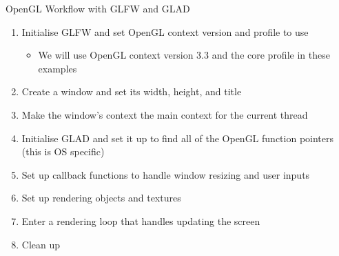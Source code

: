 \documentclass{beamer}
\begin{document}
\begin{frame}[fragile]{OpenGL Workflow with GLFW and GLAD}
    \begin{enumerate}
        \item Initialise GLFW and set OpenGL context version and profile to use
              \begin{itemize}
                  \item We will use OpenGL context version 3.3 and the core profile in these examples
              \end{itemize}
        \item Create a window and set its width, height, and title
        \item Make the window's context the main context for the current thread
        \item Initialise GLAD and set it up to find all of the OpenGL function pointers (this is OS specific)
        \item Set up callback functions to handle window resizing and user inputs
        \item Set up rendering objects and textures
        \item Enter a rendering loop that handles updating the screen
        \item Clean up
    \end{enumerate}
\end{frame}
\end{document}
